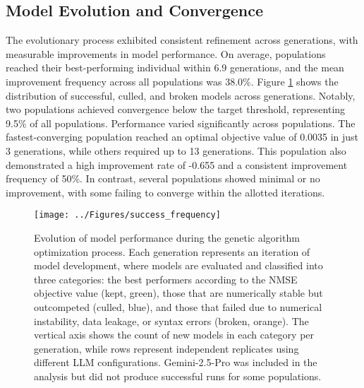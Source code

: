 \subsection{Model Evolution and Convergence}
The evolutionary process exhibited consistent refinement across generations, with measurable improvements in model performance. On average, populations reached their best-performing individual within 6.9 generations, and the mean improvement frequency across all populations was 38.0\%. Figure \ref{fig:status_distribution} shows the distribution of successful, culled, and broken models across generations. Notably, two populations achieved convergence below the target threshold, representing 9.5\% of all populations.
Performance varied significantly across populations. The fastest-converging population reached an optimal objective value of 0.0035 in just 3 generations, while others required up to 13 generations. This population also demonstrated a high improvement rate of -0.655 and a consistent improvement frequency of 50\%. In contrast, several populations showed minimal or no improvement, with some failing to converge within the allotted iterations.
\begin{figure}[H]
\centering
\texttt{[image: ../Figures/success\_frequency]}
\caption{Evolution of model performance during the genetic algorithm optimization process. Each generation represents an iteration of model development, where models are evaluated and classified into three categories: the best performers according to the NMSE objective value (kept, green), those that are numerically stable but outcompeted (culled, blue), and those that failed due to numerical instability, data leakage, or syntax errors (broken, orange). The vertical axis shows the count of new models in each category per generation, while rows represent independent replicates using different LLM configurations. Gemini-2.5-Pro was included in the analysis but did not produce successful runs for some populations.}
\label{fig:status_distribution}
\end{figure}

